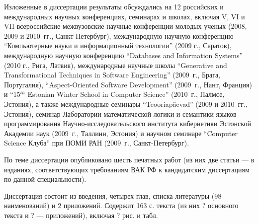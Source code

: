  Изложенные в диссертации результаты обсуждались на 12 российских и международных научных конференциях, семинарах и школах, включая 
V, VI и VII всероссийские межвузовские научные конференции молодых ученых (2008, 2009 и 2010~гг., Санкт-Петербург), 
международную научную конференцию ``Компьютерные науки и информационный технологии'' (2009 г., Саратов), 
международную научную конференцию ``Databases and Information Systems'' (2010 г., Рига, Латвия),
международные научные школы 
``Generative and Transformational Techniques in Software Engineering'' (2009~г., Брага, Португалия), 
``Aspect-Oriented Software Development'' (2009~г., Нант, Франция) 
и 
``15$^{th}$ Estonian Winter School in Computer Science'' (2010~г., Палмсе, Эстония), 
а также международные семинары 
``Teooriapäevad'' (2009 и 2010~гг., Эстония), 
семинар Лаборатории математической логики и семантики языков программирования Научно-исследовательского института кибернетики Эстонской Академии наук (2009~г., Таллинн, Эстония) и научном семинаре ``Computer Science Клуба'' при ПОМИ РАН (2009~г., Санкт-Петербург).

 По теме диссертации опубликовано шесть печатных работ (из них две статьи --- в изданиях, соответствующих требованиям ВАК РФ к кандидатским диссертациям по данной специальности).

 Диссертация состоит из введения, четырех глав, списка литературы (98 наименований) и 2 приложений. Содержит 163 с. текста (из них ? основного текста и ? --- приложений), включая ? рис. и табл.

